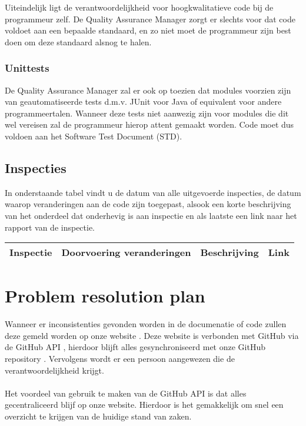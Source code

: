 Uiteindelijk ligt de verantwoordelijkheid voor hoogkwalitatieve code bij de programmeur zelf. De Quality Assurance Manager zorgt er slechts voor dat code voldoet aan een bepaalde standaard, en zo niet moet de programmeur zijn best doen om deze standaard alsnog te halen. 

\subsubsection{Unittests}
De Quality Assurance Manager zal er ook op toezien dat modules voorzien zijn van geautomatiseerde tests d.m.v. JUnit voor Java of equivalent voor andere programmeertalen. Wanneer deze tests niet aanwezig zijn voor modules die dit wel vereisen zal de programmeur hierop attent gemaakt worden. Code moet dus voldoen aan het Software Test Document (STD).

\subsection{Inspecties}
In onderstaande tabel vindt u de datum van alle uitgevoerde inspecties, de datum waarop veranderingen aan de code zijn toegepast, alsook een korte beschrijving van het onderdeel dat onderhevig is aan inspectie en als laatste een link naar het rapport van de inspectie.

\begin{center}
    \begin{tabular}{| l | l | l | l |}
    \hline
    Inspectie & Doorvoering veranderingen & Beschrijving & Link \\ \hline
    
    \end{tabular}
\end{center}


\section{Problem resolution plan}
Wanneer er inconsistenties gevonden worden in de documenatie of code zullen deze gemeld worden op onze website \cite{portalWebsite}. Deze website is verbonden met GitHub via de GitHub API \cite{GitHubAPI}, hierdoor blijft alles gesynchroniseerd met onze GitHub repository \cite{GitHubRepository}. Vervolgens wordt er een persoon aangewezen die de verantwoordelijkheid krijgt.
\\
\\
Het voordeel van gebruik te maken van de GitHub API is dat alles gecentraliceerd blijf op onze website. Hierdoor is het gemakkelijk om snel een overzicht te krijgen van de huidige stand van zaken.

